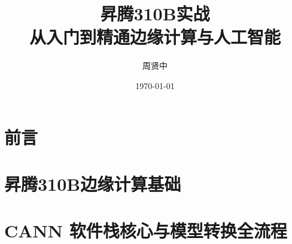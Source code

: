\documentclass[fontsize=12pt, paper=a4, oneside, DIV=calc]{scrbook}
\title{昇腾310B实战\\从入门到精通边缘计算与人工智能}
\author{周贤中}
\date{\today}
\theoremstyle{break}
\begin{document}
\maketitle

\frontmatter
\chapter*{前言}



\tableofcontents

\mainmatter


\chapter{昇腾310B边缘计算基础}


\chapter{CANN 软件栈核心与模型转换全流程}


% 

% 

% 

% 

% 

% 
\end{document}
